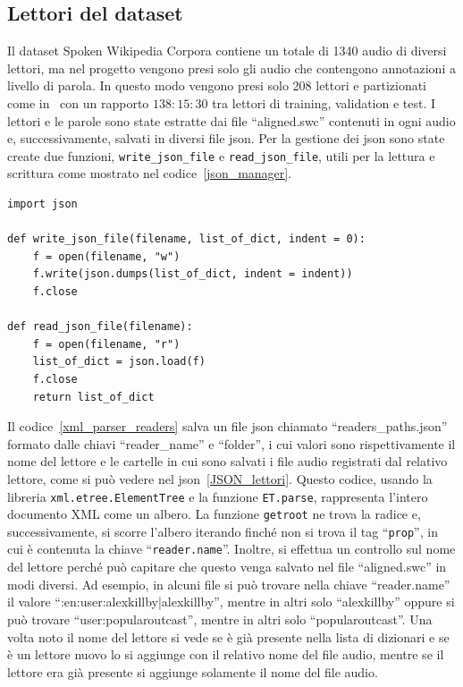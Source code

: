 \documentclass[12pt,a4paper,titlepage]{article}
\begin{document}
\subsection{Lettori del dataset}
\label{subsec:lettori}
Il dataset Spoken Wikipedia Corpora contiene un totale di 1340 audio di diversi lettori, ma nel progetto vengono presi solo gli audio che contengono annotazioni a livello di parola. In questo modo vengono presi solo 208 lettori e partizionati come in~\cite{salamon:Few-Shot} con un rapporto $138:15:30$ tra lettori di training, validation e test. I lettori e le parole sono state estratte dai file ``aligned.swc'' contenuti in ogni audio e, successivamente, salvati in diversi file json. Per la gestione dei json sono state create due funzioni, \texttt{write\_json\_file} e \texttt{read\_json\_file}, utili per la lettura e scrittura come mostrato nel codice~\ref{json_manager}.
\begin{lstlisting}[language=iPython,firstnumber=1, caption=json\_manager.py, label=json_manager,captionpos=b]
import json
	
def write_json_file(filename, list_of_dict, indent = 0):
	f = open(filename, "w")
	f.write(json.dumps(list_of_dict, indent = indent))
	f.close
	
def read_json_file(filename):
	f = open(filename, "r")
	list_of_dict = json.load(f)
	f.close
	return list_of_dict
\end{lstlisting}

Il codice~\ref{xml_parser_readers} salva un file json chiamato ``readers\_paths.json'' formato dalle chiavi ``reader\_name'' e ``folder'', i cui valori sono rispettivamente il nome del lettore e le cartelle in cui sono salvati i file audio registrati dal relativo lettore, come si può vedere nel json~\ref{JSON_lettori}. Questo codice, usando la libreria \texttt{xml.etree.ElementTree} e la funzione \texttt{ET.parse}, rappresenta l'intero documento XML come un albero. La funzione \texttt{getroot} ne trova la radice e, successivamente, si scorre l'albero iterando finché non si trova il tag ``\texttt{prop}'', in cui è contenuta la chiave ``\texttt{reader.name}''. Inoltre, si effettua un controllo sul nome del lettore perché può capitare che questo venga salvato nel file ``aligned.swc'' in modi diversi. Ad esempio, in alcuni file si può trovare nella chiave ``reader.name'' il valore ``:en:user:alexkillby|alexkillby'', mentre in altri solo ``alexkillby'' oppure si può trovare ``user:popularoutcast'', mentre in altri solo ``popularoutcast''. Una volta noto il nome del lettore si vede se è già presente nella lista di dizionari e se è un lettore nuovo lo si aggiunge con il relativo nome del file audio, mentre se il lettore era già presente si aggiunge solamente il nome del file audio.
\end{document}
